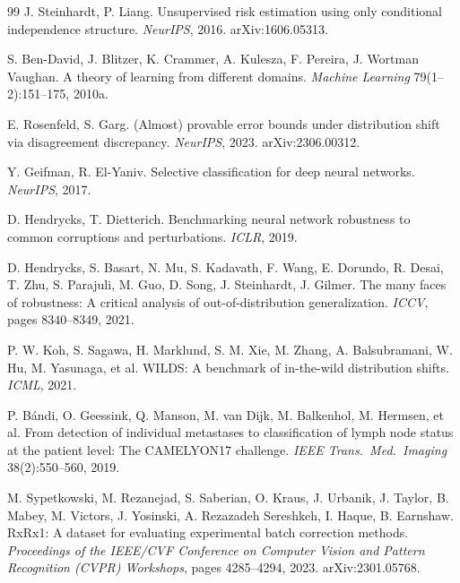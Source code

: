 \begin{thebibliography}{99}
 J. Steinhardt, P. Liang. Unsupervised risk estimation using
only conditional independence structure. \emph{NeurIPS}, 2016. arXiv:1606.05313.

 S. Ben-David, J. Blitzer, K. Crammer, A. Kulesza,
F. Pereira, J. Wortman Vaughan. A theory of learning from different domains.
\emph{Machine Learning} 79(1--2):151--175, 2010a.

 E. Rosenfeld, S. Garg. (Almost) provable error bounds
under distribution shift via disagreement discrepancy. \emph{NeurIPS}, 2023.
arXiv:2306.00312.

 Y. Geifman, R. El-Yaniv. Selective classification for
deep neural networks. \emph{NeurIPS}, 2017.

 D. Hendrycks, T. Dietterich. Benchmarking neural
network robustness to common corruptions and perturbations. \emph{ICLR}, 2019.

 D. Hendrycks, S. Basart, N. Mu,
S. Kadavath, F. Wang, E. Dorundo, R. Desai, T. Zhu, S. Parajuli, M. Guo, D. Song,
J. Steinhardt, J. Gilmer. The many faces of robustness: A critical analysis of
out-of-distribution generalization. \emph{ICCV}, pages 8340--8349, 2021.

 P. W. Koh, S. Sagawa, H. Marklund, S. M. Xie, M. Zhang,
A. Balsubramani, W. Hu, M. Yasunaga, et al. WILDS: A benchmark of in-the-wild
distribution shifts. \emph{ICML}, 2021.

 P. B\'andi, O. Geessink, Q. Manson, M. van Dijk,
M. Balkenhol, M. Hermsen, et al. From detection of individual metastases to
classification of lymph node status at the patient level: The CAMELYON17 challenge.
\emph{IEEE Trans.\ Med.\ Imaging} 38(2):550--560, 2019.

 M. Sypetkowski, M. Rezanejad, S. Saberian,
O. Kraus, J. Urbanik, J. Taylor, B. Mabey, M. Victors, J. Yosinski,
A. Rezazadeh Sereshkeh, I. Haque, B. Earnshaw.
RxRx1: A dataset for evaluating experimental batch correction methods.
\emph{Proceedings of the IEEE/CVF Conference on Computer Vision and Pattern Recognition
(CVPR) Workshops}, pages 4285--4294, 2023. arXiv:2301.05768.


\end{thebibliography}
